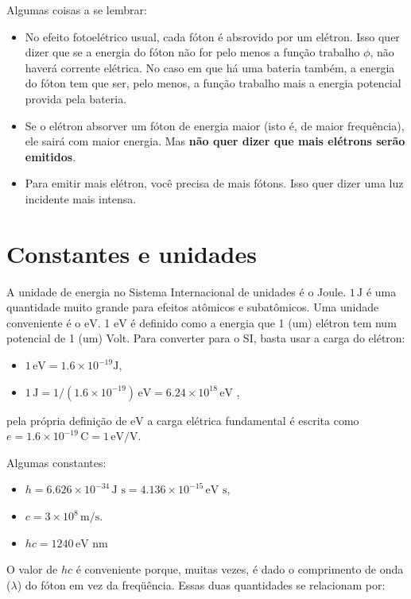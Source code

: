 \documentclass{article}
\begin{document}
Algumas coisas a se lembrar:
\begin{itemize}
\item No efeito fotoel\'etrico usual, cada f\'oton \'e absrovido por um el\'etron. Isso quer dizer que se a energia do f\'oton n\~ao for pelo menos a fun\c c\~ao trabalho $\phi$, n\~ao haver\'a corrente el\'etrica. No caso em que h\'a uma bateria tamb\'em, a energia do f\'oton tem que ser, pelo menos, a fun\c c\~ao trabalho mais a energia potencial provida pela bateria.
\item Se o el\'etron absorver um f\'oton de energia maior (isto \'e, de maior frequ\^encia), ele sair\'a com maior energia. Mas \textbf{n\~ao quer dizer que mais el\'etrons ser\~ao emitidos}.
\item Para emitir mais el\'etron, voc\^e precisa de mais f\'otons. Isso quer dizer uma luz incidente mais intensa.
\end{itemize}

\section{Constantes e unidades}

A unidade de energia no Sistema Internacional de unidades \'e o Joule. $1\,\text{J}$ \'e uma quantidade muito grande para efeitos at\^omicos e subat\^omicos. Uma unidade conveniente \'e o $\text{eV}$. 1 $\text{eV}$ \'e definido como a energia que 1 (um) el\'etron tem num potencial de 1 (um) Volt. Para converter para o SI, basta usar a carga do el\'etron:

\begin{itemize}
\item $1\,\text{eV} = 1.6\times 10^{-19}\text{J}$,
\item $1\,\text{J} = 1/(1.6\times 10^{-19})\,\text{eV} = 6.24\times 10^{18}\,\text{eV}$ ,
\end{itemize}
pela pr\'opria defini\c c\~ao de $\text{eV}$ a carga el\'etrica fundamental \'e escrita como $e = 1.6\times 10^{-19}\,\text{C} = 1\,\text{eV/V}$.

Algumas constantes:

\begin{itemize}
\item $h = 6.626\times 10^{-34}\,\text{J s} = 4.136\times 10^{-15}\,\text{eV s}$,
\item $c = 3\times 10^{8}\,\text{m/s}$.
\item $hc = 1240\,\text{eV nm}$
\end{itemize}
O valor de $hc$ \'e conveniente porque, muitas vezes, \'e dado o comprimento de onda ($\lambda$) do f\'oton em vez da freq\"u\^encia. Essas duas quantidades se relacionam por:
\end{document}
